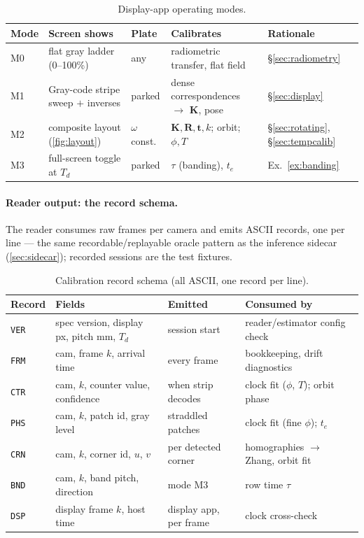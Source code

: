 \documentclass[11pt]{article}
\theoremstyle{definition}
\newcommand{\mat}[1]{\mathbf{#1}}
\newcommand{\vect}[1]{\mathbf{#1}}
\newcommand{\R}{\mat{R}}
\newcommand{\K}{\mat{K}}
\newcommand{\tv}{\vect{t}}
\newcommand{\code}[1]{\texttt{#1}}
\begin{document}
\begin{table}[ht]
\centering
\scriptsize
\setlength{\tabcolsep}{4pt}
\begin{tabular}{l l l l l}
\toprule
Mode & Screen shows & Plate & Calibrates & Rationale \\
\midrule
M0 & flat gray ladder (0--100\%) & any & radiometric transfer, flat field & \S\ref{sec:radiometry} \\
M1 & Gray-code stripe sweep $+$ inverses & parked & dense correspondences $\to$ $\K$, pose & \S\ref{sec:display} \\
M2 & composite layout (\autoref{fig:layout}) & $\omega$ const. & $\K,\R,\tv,k$; orbit; $\phi,T$ & \S\ref{sec:rotating}, \S\ref{sec:tempcalib} \\
M3 & full-screen toggle at $T_d$ & parked & $\tau$ (banding), $t_e$ & Ex.~\ref{ex:banding} \\
\bottomrule
\end{tabular}
\caption{Display-app operating modes.}
\label{tab:modes}
\end{table}

\paragraph{Reader output: the record schema.} The reader consumes raw
frames per camera and emits ASCII records, one per line --- the same
recordable/replayable oracle pattern as the inference sidecar
(\autoref{sec:sidecar}); recorded sessions are the test fixtures.

\begin{table}[ht]
\centering
\footnotesize
\begin{tabular}{l l l l}
\toprule
Record & Fields & Emitted & Consumed by \\
\midrule
\code{VER} & spec version, display px, pitch mm, $T_d$ & session start & reader/estimator config check \\
\code{FRM} & cam, frame $k$, arrival time & every frame & bookkeeping, drift diagnostics \\
\code{CTR} & cam, $k$, counter value, confidence & when strip decodes & clock fit ($\phi$, $T$); orbit phase \\
\code{PHS} & cam, $k$, patch id, gray level & straddled patches & clock fit (fine $\phi$); $t_e$ \\
\code{CRN} & cam, $k$, corner id, $u$, $v$ & per detected corner & homographies $\to$ Zhang, orbit fit \\
\code{BND} & cam, $k$, band pitch, direction & mode M3 & row time $\tau$ \\
\code{DSP} & display frame $k$, host time & display app, per frame & clock cross-check \\
\bottomrule
\end{tabular}
\caption{Calibration record schema (all ASCII, one record per line).}
\label{tab:records}
\end{table}
\end{document}
